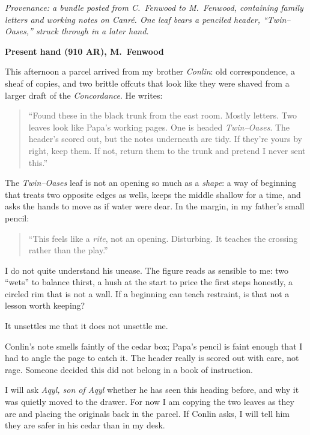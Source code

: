\documentclass[11pt]{article}
\begin{document}
\noindent\textit{Provenance: a bundle posted from C.\ Fenwood to M.\ Fenwood, containing family letters and working notes on \emph{Canr\'e}. One leaf bears a penciled header, ``Twin--Oases,'' struck through in a later hand.}

\medskip
\noindent\textbf{Present hand (910 AR), M.\ Fenwood}

This afternoon a parcel arrived from my brother \textit{Conlin}: old correspondence, a sheaf of copies, and two brittle offcuts that look like they were shaved from a larger draft of the \emph{Concordance}. He writes:

\begin{quote}\small
``Found these in the black trunk from the east room. Mostly letters. Two leaves look like Papa’s working pages. One is headed \emph{Twin--Oases}. The header’s scored out, but the notes underneath are tidy. If they’re yours by right, keep them. If not, return them to the trunk and pretend I never sent this.''
\end{quote}

The \emph{Twin--Oases} leaf is not an opening so much as a \emph{shape}: a way of beginning that treats two opposite edges as wells, keeps the middle shallow for a time, and asks the hands to move as if water were dear. In the margin, in my father’s small pencil:

\begin{quote}\small
``This feels like a \emph{rite}, not an opening. Disturbing. It teaches the crossing rather than the play.''
\end{quote}

I do not quite understand his unease. The figure reads as sensible to me: two “wets” to balance thirst, a hush at the start to price the first steps honestly, a circled rim that is not a wall. If a beginning can teach restraint, is that not a lesson worth keeping?

It unsettles me that it does not unsettle me.

Conlin’s note smells faintly of the cedar box; Papa’s pencil is faint enough that I had to angle the page to catch it. The header really is scored out with care, not rage. Someone decided this did not belong in a book of instruction.

I will ask \textit{Aqyl, son of Aqyl} whether he has seen this heading before, and why it was quietly moved to the drawer. For now I am copying the two leaves as they are and placing the originals back in the parcel. If Conlin asks, I will tell him they are safer in his cedar than in my desk.
\end{document}
